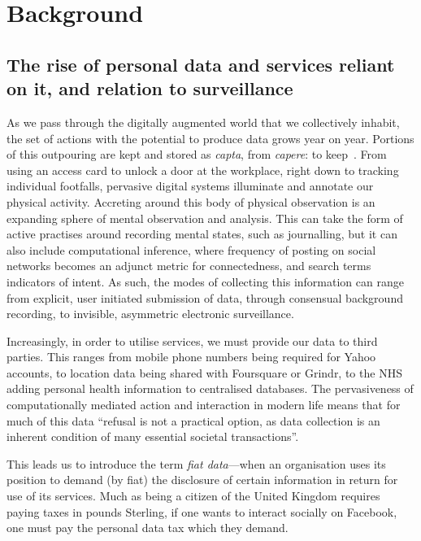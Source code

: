 \documentclass{IOS-Book-Article}     %
\begin{document}
\section{Background}

\subsection{The rise of personal data and services reliant on it, and relation
to surveillance}

As we pass through the digitally augmented world that we collectively inhabit,
the set of actions with the potential to produce data grows year on year.
Portions of this outpouring are kept and stored as
\emph{capta}, from \emph{capere}: to keep~\cite{dodge2005codes}. From
using an access card to unlock a door at the workplace, right down to tracking
individual footfalls, pervasive digital systems illuminate and annotate our
physical activity. Accreting around this body of physical observation is an
expanding sphere of mental observation and analysis. This can take the form of
active practises around recording mental states, such as journalling, but it can
also include computational inference, where frequency of posting on social
networks becomes an adjunct metric for connectedness, and search terms 
indicators of intent. As such, the modes of collecting this information can
range from explicit, user initiated submission of data, through consensual
background recording, to invisible, asymmetric electronic surveillance.

Increasingly, in order to utilise services, we must provide our data to third
parties. This ranges from mobile phone numbers being required for Yahoo
accounts, to location data being shared with Foursquare or Grindr, to the NHS
adding personal health information to centralised databases. 
The pervasiveness of computationally mediated action and interaction in modern
life means that for much of this data ``refusal is not a practical option, as
data collection is an inherent condition of many essential societal
transactions''\cite{brunton2011vernacular}. 

This leads us to introduce the term 
\emph{fiat data}---when an
organisation uses its position to demand (by fiat) the disclosure of certain
information in return for use of its services. 
Much as being a citizen of the United Kingdom requires paying taxes in pounds
Sterling, if one wants to interact socially on Facebook, one must pay the
personal data tax which they demand. 
\end{document}
